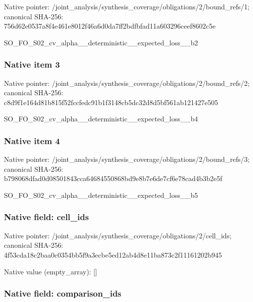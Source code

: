 \documentclass[10pt,a4paper]{article}
\begin{document}
Native pointer: /joint\_analysis/synthesi\allowbreak{}s\_coverage/obligations/2\allowbreak{}/bound\_refs/1; canonical SHA-256: 756d62e0537a8f4e461e8012\allowbreak{}f46a6d0da7ff2bdfbfad11a6\allowbreak{}03296ceef8602c5e


SO\_FO\_S02\_cv\_alpha\_\_dete\allowbreak{}rministic\_\_expected\_loss\allowbreak{}\_\_b2


\subsubsection{Native item 3}


Native pointer: /joint\_analysis/synthesi\allowbreak{}s\_coverage/obligations/2\allowbreak{}/bound\_refs/2; canonical SHA-256: c8d9f1e164d81b815f52fccf\allowbreak{}edc91b1f3148cb5dc32d8d5b\allowbreak{}f561ab121427e505


SO\_FO\_S02\_cv\_alpha\_\_dete\allowbreak{}rministic\_\_expected\_loss\allowbreak{}\_\_b4


\subsubsection{Native item 4}


Native pointer: /joint\_analysis/synthesi\allowbreak{}s\_coverage/obligations/2\allowbreak{}/bound\_refs/3; canonical SHA-256: b798068dfad0d08501843cca\allowbreak{}64684550868bd9e8b7e6de7c\allowbreak{}f6e78cad4b3b2e5f


SO\_FO\_S02\_cv\_alpha\_\_dete\allowbreak{}rministic\_\_expected\_loss\allowbreak{}\_\_b5


\subsubsection{Native field: cell\_ids}


Native pointer: /joint\_analysis/synthesi\allowbreak{}s\_coverage/obligations/2\allowbreak{}/cell\_ids; canonical SHA-256: 4f53cda18c2baa0c0354bb5f\allowbreak{}9a3ecbe5ed12ab4d8e11ba87\allowbreak{}3c2f11161202b945



Native value (empty\_array): []



\subsubsection{Native field: comparison\_ids}
\end{document}
